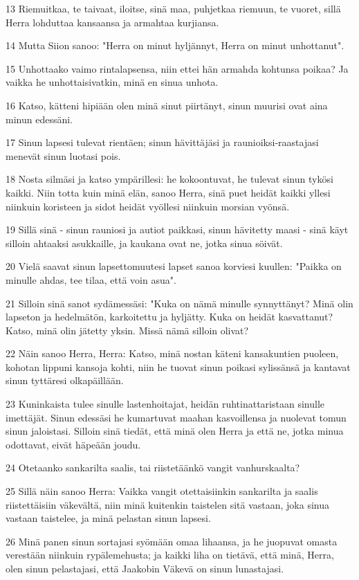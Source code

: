 \par 13 Riemuitkaa, te taivaat, iloitse, sinä maa, puhjetkaa riemuun, te vuoret, sillä Herra lohduttaa kansaansa ja armahtaa kurjiansa.
\par 14 Mutta Siion sanoo: "Herra on minut hyljännyt, Herra on minut unhottanut".
\par 15 Unhottaako vaimo rintalapsensa, niin ettei hän armahda kohtunsa poikaa? Ja vaikka he unhottaisivatkin, minä en sinua unhota.
\par 16 Katso, kätteni hipiään olen minä sinut piirtänyt, sinun muurisi ovat aina minun edessäni.
\par 17 Sinun lapsesi tulevat rientäen; sinun hävittäjäsi ja raunioiksi-raastajasi menevät sinun luotasi pois.
\par 18 Nosta silmäsi ja katso ympärillesi: he kokoontuvat, he tulevat sinun tykösi kaikki. Niin totta kuin minä elän, sanoo Herra, sinä puet heidät kaikki yllesi niinkuin koristeen ja sidot heidät vyöllesi niinkuin morsian vyönsä.
\par 19 Sillä sinä - sinun rauniosi ja autiot paikkasi, sinun hävitetty maasi - sinä käyt silloin ahtaaksi asukkaille, ja kaukana ovat ne, jotka sinua söivät.
\par 20 Vielä saavat sinun lapsettomuutesi lapset sanoa korviesi kuullen: "Paikka on minulle ahdas, tee tilaa, että voin asua".
\par 21 Silloin sinä sanot sydämessäsi: "Kuka on nämä minulle synnyttänyt? Minä olin lapseton ja hedelmätön, karkoitettu ja hyljätty. Kuka on heidät kasvattanut? Katso, minä olin jätetty yksin. Missä nämä silloin olivat?
\par 22 Näin sanoo Herra, Herra: Katso, minä nostan käteni kansakuntien puoleen, kohotan lippuni kansoja kohti, niin he tuovat sinun poikasi sylissänsä ja kantavat sinun tyttäresi olkapäillään.
\par 23 Kuninkaista tulee sinulle lastenhoitajat, heidän ruhtinattaristaan sinulle imettäjät. Sinun edessäsi he kumartuvat maahan kasvoillensa ja nuolevat tomun sinun jaloistasi. Silloin sinä tiedät, että minä olen Herra ja että ne, jotka minua odottavat, eivät häpeään joudu.
\par 24 Otetaanko sankarilta saalis, tai riistetäänkö vangit vanhurskaalta?
\par 25 Sillä näin sanoo Herra: Vaikka vangit otettaisiinkin sankarilta ja saalis riistettäisiin väkevältä, niin minä kuitenkin taistelen sitä vastaan, joka sinua vastaan taistelee, ja minä pelastan sinun lapsesi.
\par 26 Minä panen sinun sortajasi syömään omaa lihaansa, ja he juopuvat omasta verestään niinkuin rypälemehusta; ja kaikki liha on tietävä, että minä, Herra, olen sinun pelastajasi, että Jaakobin Väkevä on sinun lunastajasi.

